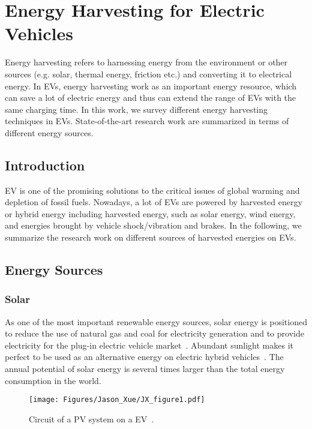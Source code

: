 \section{Energy Harvesting for Electric Vehicles} \label{sec:harvesting}

Energy harvesting refers to harnessing energy from the environment or other sources (e.g. solar, thermal energy, friction etc.) and converting it to electrical energy. 
In EVs, energy harvesting work as an important energy resource, which can save a lot of electric energy and thus can extend the range of EVs with the same charging time. 
In this work, we survey different energy harvesting techniques in EVs. 
State-of-the-art research work are summarized in terms of different energy sources.

\subsection{Introduction}

EV is one of the promising solutions to the critical issues of global warming and depletion of fossil fuels.
Nowadays, a lot of EVs are powered by harvested energy or hybrid energy including harvested energy, such as solar energy, wind energy, and energies brought by vehicle shock/vibration and brakes.
In the following, we summarize the research work on different sources of harvested energies on EVs.

\subsection{Energy Sources}

\subsubsection{Solar}

As one of the most important renewable energy sources, solar energy is positioned to reduce the use of natural gas and coal for electricity generation and to provide electricity for the plug-in electric vehicle market~\cite{JX_21}. Abundant sunlight makes it perfect to be used as an alternative energy on electric hybrid vehicles~\cite{JX_10,JX_63}. The annual potential of solar energy is several times larger than the total energy consumption in the world.

\begin{figure}
\centering
\texttt{[image: Figures/Jason\_Xue/JX\_figure1.pdf]}
\caption{Circuit of a PV system on a EV~\cite{JX_68}.}
\label{JX_image1}
\end{figure}      

